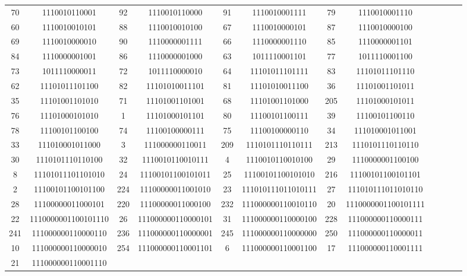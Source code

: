 \documentclass[conference,onecolumn,12pt]{IEEEtran}
\numberwithin{equation}{subsection}
\begin{document}
\begin{itemize}
\begin{table}[H]
\begin{tabular}{cccccccccccc}
70 & 1110010110001 & 92 & 1110010110000 & 91 & 1110010001111 & 79 & 1110010001110 \\
60 & 1110010010101 & 88 & 1110010010100 & 67 & 1110010000101 & 87 & 1110010000100 \\
69 & 1110010000010 & 90 & 1110000001111 & 66 & 1110000001110 & 85 & 1110000001101 \\
84 & 1110000001001 & 86 & 1110000001000 & 63 & 1011110001101 & 77 & 1011110001100 \\
73 & 1011110000011 & 72 & 1011110000010 & 64 & 11101011101111 & 83 & 11101011101110 \\
62 & 11101011101100 & 82 & 11101010011101 & 81 & 11101010011100 & 36 & 11101001101011 \\
35 & 11101001101010 & 71 & 11101001101001 & 68 & 11101001101000 & 205 & 11101000101011 \\
76 & 11101000101010 & 1 & 11101000101101 & 80 & 11100101100111 & 39 & 11100101100110 \\
78 & 11100101100100 & 74 & 11100100000111 & 75 & 11100100000110 & 34 & 111010001011001 \\
33 & 111010001011000 & 3 & 111000000110011 & 209 & 1110101110110111 & 213 & 1110101110110110 \\
30 & 1110101110110100 & 32 & 1110010110010111 & 4 & 1110010110010100 & 29 & 1110000001100100 \\
8 & 11101011101101010 & 24 & 11100101100101011 & 25 & 11100101100101010 & 216 & 11100101100101101 \\
2 & 11100101100101100 & 224 & 11100000011001010 & 23 & 111010111011010111 & 27 & 111010111011010110 \\
28 & 11100000011000101 & 220 & 11100000011000100 & 232 & 111000000110010110 & 20 & 1110000001100101111 \\
22 & 1110000001100101110 & 26 & 111000000110000101 & 31 & 111000000110000100 & 228 & 111000000110000111 \\
241 & 111000000110000110 & 236 & 111000000110000001 & 245 & 111000000110000000 & 250 & 111000000110000011 \\
10 & 111000000110000010 & 254 & 111000000110001101 & 6 & 111000000110001100 & 17 & 111000000110001111 \\
21 & 111000000110001110 \\
\bottomrule
\end{tabular}
\end{table}

    
\end{itemize}
\end{document}
